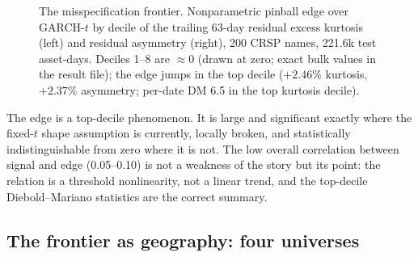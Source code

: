 \documentclass[11pt]{article}
\theoremstyle{remark}
\begin{document}
\begin{figure}[t]
\centering
{}\hfill
{}
\caption{The misspecification frontier. Nonparametric pinball edge over
GARCH-$t$ by decile of the trailing 63-day residual excess kurtosis
(left) and residual asymmetry (right), 200 CRSP names, 221.6k test
asset-days. Deciles 1--8 are $\approx 0$ (drawn at zero; exact bulk
values in the result file); the edge jumps in the top decile
($+2.46\%$ kurtosis, $+2.37\%$ asymmetry; per-date DM 6.5 in the top
kurtosis decile).}
\label{fig:frontier}
\end{figure}

The edge is a top-decile phenomenon. It is large and significant exactly
where the fixed-$t$ shape assumption is currently, locally broken, and
statistically indistinguishable from zero where it is not. The low
overall correlation between signal and edge (0.05--0.10) is not a
weakness of the story but its point: the relation is a threshold
nonlinearity, not a linear trend, and the top-decile Diebold--Mariano
statistics are the correct summary.

\subsection{The frontier as geography: four universes}
\end{document}
